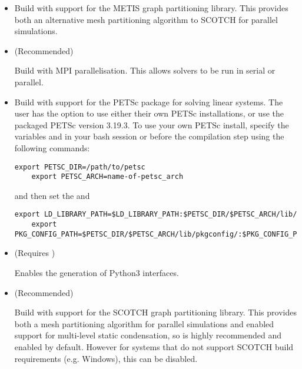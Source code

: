 \begin{itemize}
    \item {}

    Build \nekpp with support for the METIS graph partitioning library. This
    provides both an alternative mesh partitioning algorithm to SCOTCH for
    parallel simulations.

    \item {} (Recommended)

    Build \nekpp with MPI parallelisation. This allows solvers to be run in
    serial or parallel.

    \item {}

    Build \nekpp with support for the PETSc package for solving linear systems. 
    The user has the option to use either their own PETSc installations, or use 
    the packaged PETSc version 3.19.3. To use your own PETSc install, specify 
    the variables  and  in your bash session 
    or  before the \nekpp compilation step using the following commands:

    \begin{lstlisting}[style=BashInputStyle]
    export PETSC_DIR=/path/to/petsc
    export PETSC_ARCH=name-of-petsc_arch
    \end{lstlisting}
    and then set the  and 
    \begin{lstlisting}[style=BashInputStyle]
    export LD_LIBRARY_PATH=$LD_LIBRARY_PATH:$PETSC_DIR/$PETSC_ARCH/lib/
    export PKG_CONFIG_PATH=$PETSC_DIR/$PETSC_ARCH/lib/pkgconfig/:$PKG_CONFIG_PATH
    \end{lstlisting}

    \item {} (Requires )

    Enables the generation of Python3 interfaces.

    \item {} (Recommended)

    Build \nekpp with support for the SCOTCH graph partitioning library. This
    provides both a mesh partitioning algorithm for parallel simulations and
    enabled support for multi-level static condensation, so is highly
    recommended and enabled by default. However for systems that do not support
    SCOTCH build requirements (e.g. Windows), this can be disabled.


\end{itemize}
